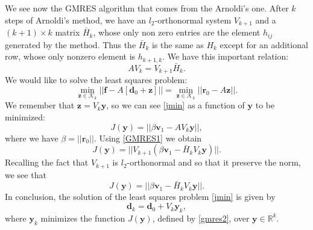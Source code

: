 We see now the GMRES algorithm that comes from the Arnoldi's one. After $k$ steps of Arnoldi's method, we have an $l_2$-orthonormal system $V_{k+1}$ and a $(k+1) \times k$ matrix $\bar{H}_k$, whose only non zero entries are the element $h_{ij}$ generated by the method. Thus the $\bar{H}_k$ is the same as $H_k$ except for an additional row, whose only nonzero element is $h_{k+1,k}$. We have this important relation:
\begin{equation}
\label{GMRES1}
AV_k=V_{k+1}\bar{H}_k.
\end{equation}
We would like to solve the least squares problem: 
\begin{equation}
\label{jmin}
\min_{\textbf{z} \in \mathcal{K}_k} ||\textbf{f}-A[\textbf{d}_0+\textbf{z}]|| = \min_{\textbf{z} \in \mathcal{K}_k}||\textbf{r}_0-A\textbf{z}||.
\end{equation}
We remember that $\textbf{z}=V_k\textbf{y}$, so we can see \eqref{jmin} as a function of $\textbf{y}$ to be minimized:
\begin{equation*}
J(\textbf{y})=||\beta \textbf{v}_1 -A V_k \textbf{y}||,
\end{equation*}
where we have $\beta = ||\textbf{r}_0||$. Using \ref{GMRES1} we obtain 
\begin{equation*}
J(\textbf{y})=||V_{k+1} ( \beta \textbf{v}_1 -\bar{H}_k V_k \textbf{y} ) ||.
\end{equation*}
Recalling the fact that $V_{k+1}$ is $l_2$-orthonormal and so that it preserve the norm, we see that 
\begin{equation}
\label{gmres2}
J(\textbf{y})=|| \beta \textbf{v}_1 -\bar{H}_k V_k \textbf{y} ||.
\end{equation}
In conclusion, the solution of the least squares problem \eqref{jmin} is given by 
\begin{equation*}
\textbf{d}_k = \textbf{d}_0 + V_k \textbf{y}_k,
\end{equation*}
where $\textbf{y}_k$ minimizes the function $J(\textbf{y})$, defined by \eqref{gmres2}, over $\textbf{y} \in \mathbb{R}^k$. \\

